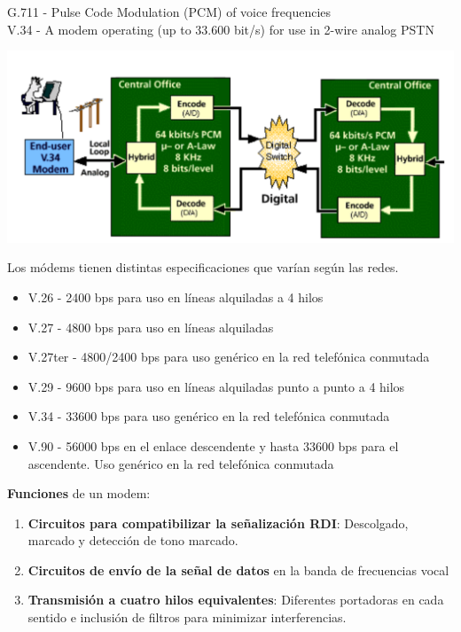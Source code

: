 \documentclass[10pt,portrait, twocolumn]{article}
\begin{document}
G.711 - Pulse Code Modulation (PCM) of voice frequencies\\
V.34 - A modem operating (up to 33.600 bit/s) for use in 2-wire analog PSTN

	\begin{center}
		\includegraphics[scale=0.2]{images/SpecsModem}
	\end{center}

Los módems tienen distintas especificaciones que varían según las redes.

\begin{itemize}
	\item V.26 - 2400 bps para uso en líneas alquiladas a 4 hilos
	\item V.27 - 4800 bps para uso en líneas alquiladas
	\item V.27ter - 4800/2400 bps para uso genérico en la red telefónica conmutada
	\item V.29 - 9600 bps para uso en líneas alquiladas punto a punto a 4 hilos
	\item V.34 - 33600 bps para uso genérico en la red telefónica conmutada
	\item V.90 - 56000 bps en el enlace descendente y hasta 33600 bps para el ascendente. Uso genérico en la red telefónica conmutada
\end{itemize}

\textbf{Funciones} de un modem:

	\begin{enumerate}
		\item \textbf{Circuitos para compatibilizar la señalización RDI}: Descolgado, marcado y detección de tono marcado.
		\item \textbf{Circuitos de envío de la señal de datos} en la banda de frecuencias vocal
		\item \textbf{Transmisión a cuatro hilos equivalentes}: Diferentes portadoras en cada sentido e inclusión de filtros para minimizar interferencias.
	\end{enumerate}
	
\end{document}
